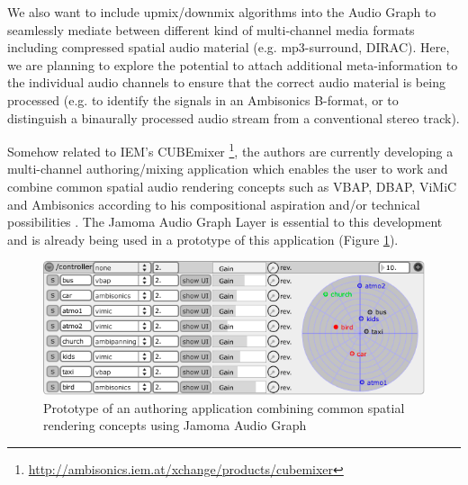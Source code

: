\documentclass[twoside,a4paper]{article}
\begin{document}
We also want to include upmix/downmix algorithms into the Audio Graph to seamlessly mediate between different kind of multi-channel media formats including compressed spatial audio material (e.g. mp3-surround, DIRAC). Here, we are planning to explore the potential to attach additional meta-information to the individual audio channels to ensure that the correct audio material is being processed (e.g. to identify the signals in an Ambisonics B-format, or to distinguish a binaurally processed audio stream from a conventional stereo track). 

Somehow related to IEM's CUBEmixer \footnote{\url{http://ambisonics.iem.at/xchange/products/cubemixer}}, the authors are currently developing a multi-channel authoring/mixing application which enables the user to work and combine common spatial audio rendering concepts such as VBAP, DBAP, ViMiC \cite{Peters:2008b} and Ambisonics according to his compositional aspiration and/or technical possibilities \cite{Peters:2009}. The Jamoma Audio Graph Layer is essential to this development and is already being used in a prototype of this application (Figure \ref{fig:SceneMixer}).
\begin{figure}[htbp]
	\centering
		\includegraphics[width=1\columnwidth]{SceneMixer.png}
	\caption{Prototype of an authoring application combining common spatial rendering concepts using Jamoma Audio Graph}
	\label{fig:SceneMixer}
\end{figure}

%                                    
\end{document}

